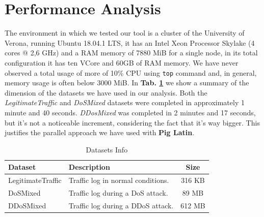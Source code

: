 \section{Performance Analysis}
\label{sec:perfanalysis}
The environment in which we tested our tool is a cluster of the University of Verona, running Ubuntu 18.04.1 LTS, it has an Intel Xeon Processor Skylake (4 cores @ 2,6 GHz) and a RAM memory of 7880 MiB for a single node, in its total configuration it has ten VCore and 60GB of RAM memory. 
We have never observed a total usage of more of 10\% CPU using \texttt{top} command and, in general, memory usage is often below 3000 MiB.
%
In \textbf{Tab. \ref{tab:dataset_info}} we show a summary of the dimension of the datasets we have used in our analysis. Both the \textit{LegitimateTraffic} and \textit{DoSMixed} datasets were completed in approximately 1 minute and 40 seconds. \textit{DDosMixed} was completed in 2 minutes and 17 seconds, but it's not a noticeable increment, considering the fact that it's way bigger. This justifies the parallel approach we have used with \textbf{Pig Latin}.

\begin{table}[!htbp]
\centering
\begin{tabular}{|l|l|c|}
\hline
\textbf{Dataset} & \textbf{Description}                              & \textbf{Size} \\ \hline
LegitimateTraffic         & Traffic log in normal conditions. & 316 KB        \\ 
DoSMixed        & Traffic log during a DoS attack.                   & 89 MB       \\ 
DDoSMixed        & Traffic log during a DDoS attack. & 612 MB        \\ \hline
\end{tabular}
\caption{Datasets Info}
\label{tab:dataset_info}
\end{table}
